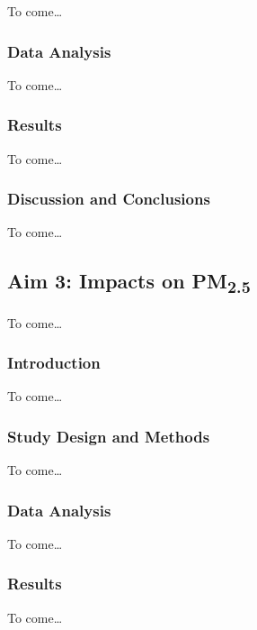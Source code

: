 \documentclass[
  letterpaper,
  DIV=11,
  numbers=noendperiod]{scrartcl}
\begin{document}
To come\ldots{}

\subsubsection{Data Analysis}\label{data-analysis-1}

To come\ldots{}

\subsubsection{Results}\label{results-1}

To come\ldots{}

\subsubsection{Discussion and
Conclusions}\label{discussion-and-conclusions-1}

To come\ldots{}

\subsection{\texorpdfstring{Aim 3: Impacts on
PM\textsubscript{2.5}}{Aim 3: Impacts on PM2.5}}\label{aim-3-impacts-on-pm2.5}

To come\ldots{}

\subsubsection{Introduction}\label{introduction-3}

To come\ldots{}

\subsubsection{Study Design and
Methods}\label{study-design-and-methods-2}

To come\ldots{}

\subsubsection{Data Analysis}\label{data-analysis-2}

To come\ldots{}

\subsubsection{Results}\label{results-2}

To come\ldots{}
\end{document}
